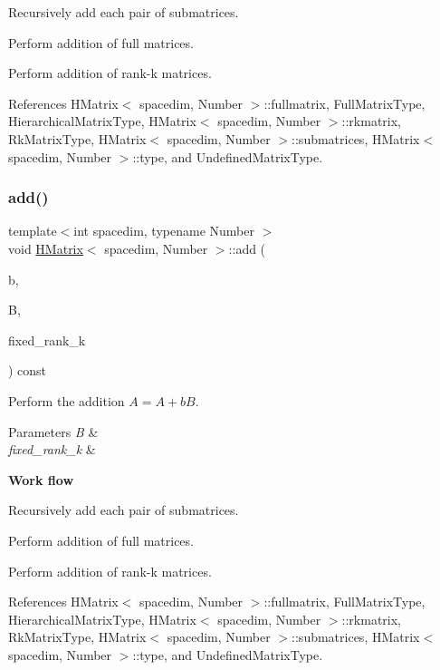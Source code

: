 Recursively add each pair of submatrices.

Perform addition of full matrices.

Perform addition of rank-\/k matrices.

References H\+Matrix$<$ spacedim, Number $>$\+::fullmatrix, Full\+Matrix\+Type, Hierarchical\+Matrix\+Type, H\+Matrix$<$ spacedim, Number $>$\+::rkmatrix, Rk\+Matrix\+Type, H\+Matrix$<$ spacedim, Number $>$\+::submatrices, H\+Matrix$<$ spacedim, Number $>$\+::type, and Undefined\+Matrix\+Type.

\mbox{\label{classHMatrix_af42aaa86b9f47c5c1514e4f06e343db6}} 
\subsubsection{\texorpdfstring{add()}{add()}\hspace{0.1cm}{\footnotesize\ttfamily [4/10]}}
{\footnotesize\ttfamily template$<$int spacedim, typename Number $>$ \\
void \hyperlink{classHMatrix}{H\+Matrix}$<$ spacedim, Number $>$\+::add (\begin{DoxyParamCaption}\item[{const Number}]{b,  }\item[{const \hyperlink{classHMatrix}{H\+Matrix}$<$ spacedim, Number $>$ \&}]{B,  }\item[{const \hyperlink{classHMatrix_a5ca8dc549783d38371a01ecd621ecb34}{size\+\_\+type}}]{fixed\+\_\+rank\+\_\+k }\end{DoxyParamCaption}) const}

Perform the addition $A = A + b B$. 
\begin{DoxyParams}{Parameters}
{\em B} & \\
\hline
{\em fixed\+\_\+rank\+\_\+k} & \\
\hline
\end{DoxyParams}
{\bfseries Work flow}

Recursively add each pair of submatrices.

Perform addition of full matrices.

Perform addition of rank-\/k matrices.

References H\+Matrix$<$ spacedim, Number $>$\+::fullmatrix, Full\+Matrix\+Type, Hierarchical\+Matrix\+Type, H\+Matrix$<$ spacedim, Number $>$\+::rkmatrix, Rk\+Matrix\+Type, H\+Matrix$<$ spacedim, Number $>$\+::submatrices, H\+Matrix$<$ spacedim, Number $>$\+::type, and Undefined\+Matrix\+Type.

